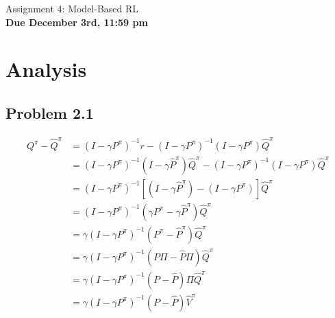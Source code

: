 \documentclass{article}
\begin{document}

\begin{centering}
    {\Large Assignment 4: Model-Based RL} \\
    \vspace{.25cm}
    \textbf{Due December 3rd, 11:59 pm} \\
\end{centering}

\setcounter{section}{1}
\section{Analysis}
\subsection*{Problem 2.1}
\begin{align*}
Q^\pi - \widehat{Q}^\pi &= (I-\gamma P^\pi)^{-1}r - (I-\gamma P^\pi)^{-1}(I-\gamma P^\pi)\widehat{Q}^\pi \\
&= (I-\gamma P^\pi)^{-1}(I- \gamma \widehat{P}^\pi)\widehat{Q}^\pi - (I-\gamma P^\pi)^{-1}(I-\gamma P^\pi)\widehat{Q}^\pi \\
&= (I-\gamma P^\pi)^{-1}[(I- \gamma \widehat{P}^\pi) - (I-\gamma P^\pi)]\widehat{Q}^\pi \\
&= (I-\gamma P^\pi)^{-1}(\gamma P^\pi - \gamma \widehat{P}^\pi)\widehat{Q}^\pi \\
&= \gamma (I-\gamma P^\pi)^{-1}(P^\pi - \widehat{P}^\pi)\widehat{Q}^\pi \\
&= \gamma (I-\gamma P^\pi)^{-1}(P\Pi - \widehat{P}\Pi)\widehat{Q}^\pi \\
&= \gamma (I-\gamma P^\pi)^{-1}(P - \widehat{P})\Pi\widehat{Q}^\pi \\
&= \gamma (I-\gamma P^\pi)^{-1}(P - \widehat{P})\widehat{V}^\pi \\
\end{align*}
\end{document}
